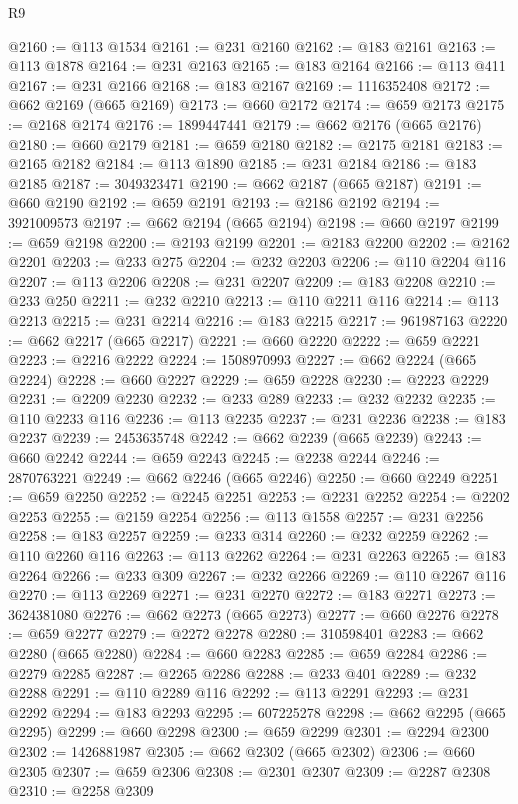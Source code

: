\begin{lexlean}{R9}
\begin{coremodule}
@2160 := @113 @1534
@2161 := @231 @2160
@2162 := @183 @2161
@2163 := @113 @1878
@2164 := @231 @2163
@2165 := @183 @2164
@2166 := @113 @411
@2167 := @231 @2166
@2168 := @183 @2167
@2169 := 1116352408
@2172 := @662 @2169 (@665 @2169)
@2173 := @660 @2172
@2174 := @659 @2173
@2175 := @2168 @2174
@2176 := 1899447441
@2179 := @662 @2176 (@665 @2176)
@2180 := @660 @2179
@2181 := @659 @2180
@2182 := @2175 @2181
@2183 := @2165 @2182
@2184 := @113 @1890
@2185 := @231 @2184
@2186 := @183 @2185
@2187 := 3049323471
@2190 := @662 @2187 (@665 @2187)
@2191 := @660 @2190
@2192 := @659 @2191
@2193 := @2186 @2192
@2194 := 3921009573
@2197 := @662 @2194 (@665 @2194)
@2198 := @660 @2197
@2199 := @659 @2198
@2200 := @2193 @2199
@2201 := @2183 @2200
@2202 := @2162 @2201
@2203 := @233 @275
@2204 := @232 @2203
@2206 := @110 @2204 @116
@2207 := @113 @2206
@2208 := @231 @2207
@2209 := @183 @2208
@2210 := @233 @250
@2211 := @232 @2210
@2213 := @110 @2211 @116
@2214 := @113 @2213
@2215 := @231 @2214
@2216 := @183 @2215
@2217 := 961987163
@2220 := @662 @2217 (@665 @2217)
@2221 := @660 @2220
@2222 := @659 @2221
@2223 := @2216 @2222
@2224 := 1508970993
@2227 := @662 @2224 (@665 @2224)
@2228 := @660 @2227
@2229 := @659 @2228
@2230 := @2223 @2229
@2231 := @2209 @2230
@2232 := @233 @289
@2233 := @232 @2232
@2235 := @110 @2233 @116
@2236 := @113 @2235
@2237 := @231 @2236
@2238 := @183 @2237
@2239 := 2453635748
@2242 := @662 @2239 (@665 @2239)
@2243 := @660 @2242
@2244 := @659 @2243
@2245 := @2238 @2244
@2246 := 2870763221
@2249 := @662 @2246 (@665 @2246)
@2250 := @660 @2249
@2251 := @659 @2250
@2252 := @2245 @2251
@2253 := @2231 @2252
@2254 := @2202 @2253
@2255 := @2159 @2254
@2256 := @113 @1558
@2257 := @231 @2256
@2258 := @183 @2257
@2259 := @233 @314
@2260 := @232 @2259
@2262 := @110 @2260 @116
@2263 := @113 @2262
@2264 := @231 @2263
@2265 := @183 @2264
@2266 := @233 @309
@2267 := @232 @2266
@2269 := @110 @2267 @116
@2270 := @113 @2269
@2271 := @231 @2270
@2272 := @183 @2271
@2273 := 3624381080
@2276 := @662 @2273 (@665 @2273)
@2277 := @660 @2276
@2278 := @659 @2277
@2279 := @2272 @2278
@2280 := 310598401
@2283 := @662 @2280 (@665 @2280)
@2284 := @660 @2283
@2285 := @659 @2284
@2286 := @2279 @2285
@2287 := @2265 @2286
@2288 := @233 @401
@2289 := @232 @2288
@2291 := @110 @2289 @116
@2292 := @113 @2291
@2293 := @231 @2292
@2294 := @183 @2293
@2295 := 607225278
@2298 := @662 @2295 (@665 @2295)
@2299 := @660 @2298
@2300 := @659 @2299
@2301 := @2294 @2300
@2302 := 1426881987
@2305 := @662 @2302 (@665 @2302)
@2306 := @660 @2305
@2307 := @659 @2306
@2308 := @2301 @2307
@2309 := @2287 @2308
@2310 := @2258 @2309

\end{coremodule}
\end{lexlean}
